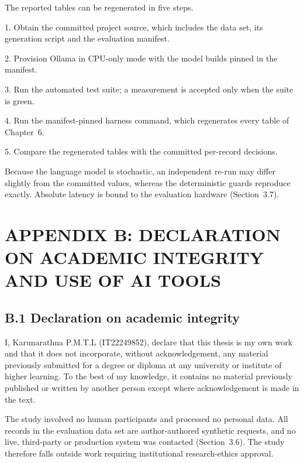 \documentclass[
]{article}
\begin{document}
The reported tables can be regenerated in five steps.

1. Obtain the committed project source, which includes the data set, its
generation script and the evaluation manifest.

2. Provision Ollama in CPU-only mode with the model builds pinned in the
manifest.

3. Run the automated test suite; a measurement is accepted only when the
suite is green.

4. Run the manifest-pinned harness command, which regenerates every
table of Chapter~6.

5. Compare the regenerated tables with the committed per-record
decisions.

Because the language model is stochastic, an independent re-run may
differ slightly from the committed values, whereas the deterministic
guards reproduce exactly. Absolute latency is bound to the evaluation
hardware (Section~3.7).

\hypertarget{appendix-b-declaration-on-academic-integrity-and-use-of-ai-tools}{%
\section{APPENDIX B: DECLARATION ON ACADEMIC INTEGRITY AND USE OF AI
TOOLS}\label{appendix-b-declaration-on-academic-integrity-and-use-of-ai-tools}}

\hypertarget{b.1-declaration-on-academic-integrity}{%
\subsection{B.1 Declaration on academic
integrity}\label{b.1-declaration-on-academic-integrity}}

I, Karunarathna P.M.T.L (IT22249852), declare that this thesis is my own
work and that it does not incorporate, without acknowledgement, any
material previously submitted for a degree or diploma at any university
or institute of higher learning. To the best of my knowledge, it
contains no material previously published or written by another person
except where acknowledgement is made in the text.

The study involved no human participants and processed no personal data.
All records in the evaluation data set are author-authored synthetic
requests, and no live, third-party or production system was contacted
(Section~3.6). The study therefore falls outside work requiring
institutional research-ethics approval.
\end{document}

